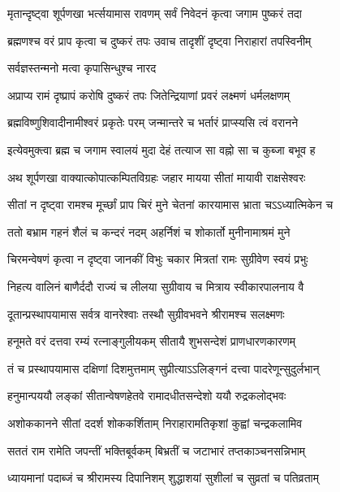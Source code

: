 \twolineshloka
{मृतान्दृष्ट्वा शूर्पणखा भर्त्सयामास रावणम्}
{सर्वं निवेदनं कृत्वा जगाम पुष्करं तदा}%


\twolineshloka
{ब्रह्मणश्च वरं प्राप कृत्वा च दुष्करं तपः}
{उवाच तादृशीं दृष्ट्वा निराहारां तपस्विनीम्}%

\onelineshloka
{सर्वज्ञस्तन्मनो मत्वा कृपासिन्धुश्च नारद}%


\twolineshloka
{अप्राप्य रामं दृष्प्रापं करोषि दुष्करं तपः}
{जितेन्द्रियाणां प्रवरं लक्ष्मणं धर्मलक्षणम्}%


\twolineshloka
{ब्रह्मविष्णुशिवादीनामीश्वरं प्रकृतेः परम्}
{जन्मान्तरे च भर्तारं प्राप्स्यसि त्वं वरानने}%


\twolineshloka
{इत्येवमुक्त्वा ब्रह्म च जगाम स्वालयं मुदा}
{देहं तत्याज सा वह्नो सा च कुब्जा बभूव ह}%


\twolineshloka
{अथ शूर्पणखा वाक्यात्कोपात्कम्पितविग्रहः}
{जहार मायया सीतां मायावी राक्षसेश्वरः}%


\twolineshloka
{सीतां न दृष्ट्वा रामश्च मूर्च्छां प्राप चिरं मुने}
{चेतनां कारयामास भ्राता चऽऽध्यात्मिकेन च}%


\twolineshloka
{ततो बभ्राम गहनं शैलं च कन्दरं नदम्}
{अहर्निशं च शोकार्तो मुनीनामाश्रमं मुने}%


\twolineshloka
{चिरमन्वेषणं कृत्वा न दृष्ट्वा जानकीं विभुः}
{चकार मित्रतां रामः सुग्रीवेण स्वयं प्रभुः}%


\twolineshloka
{निहत्य वालिनं बाणैर्ददौ राज्यं च लीलया}
{सुग्रीवाय च मित्राय स्वीकारपालनाय वै}%


\twolineshloka
{दूतान्प्रस्थापयामास सर्वत्र वानरेश्वाः}
{तस्थौ सुग्रीवभवने श्रीरामश्च सलक्ष्मणः}%


\twolineshloka
{हनूमते वरं दत्तवा रम्यं रत्नाङ्गुलीयकम्}
{सीतायै शुभसन्देशं प्राणधारणकारणम्}%


\twolineshloka
{तं च प्रस्थापयामास दक्षिणां दिशमुत्तमाम्}
{सुप्रीत्याऽऽलिङ्गनं दत्त्वा पादरेणून्सुदुर्लभान्}%


\twolineshloka
{हनुमान्पययौ लङ्कां सीतान्वेषणहेतवे}
{रामादधीतसन्देशो ययौ रुद्रकलोद्भवः}%


\twolineshloka
{अशोककानने सीतां ददर्श शोककर्शिताम्}
{निराहारामतिकृशां कुह्वां चन्द्रकलामिव}%


\twolineshloka
{सततं राम रामेति जपन्तीं भक्तिबूर्वकम्}
{बिभ्रतीं च जटाभारं तप्तकाञ्चनसन्निभाम्}%


\twolineshloka
{ध्यायमानां पदाब्जं च श्रीरामस्य दिपानिशम्}
{शुद्धाशयां सुशीलां च सुव्रतां च पतिव्रताम्}%


